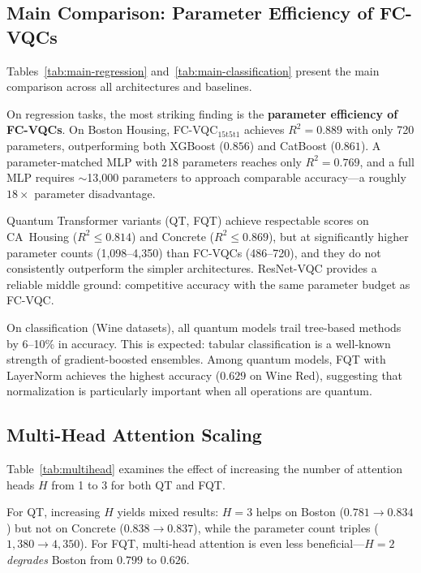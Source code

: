 


\subsection{Main Comparison: Parameter Efficiency of FC-VQCs}
\label{sec:results-main}

Tables~\ref{tab:main-regression} and~\ref{tab:main-classification} present
the main comparison across all architectures and baselines.

On regression tasks, the most striking finding is the \textbf{parameter
efficiency of FC-VQCs}.  On Boston Housing, FC-VQC$_{15\mathrm{t}5\mathrm{t}1}$
achieves $R^2{=}0.889$ with only 720 parameters, outperforming both XGBoost
($0.856$) and CatBoost ($0.861$).  A parameter-matched MLP with 218
parameters reaches only $R^2{=}0.769$, and a full MLP requires
${\sim}$13{,}000 parameters to approach comparable accuracy---a roughly
$18{\times}$ parameter disadvantage.

Quantum Transformer variants (QT, FQT) achieve respectable scores on
CA~Housing ($R^2{\leq}0.814$) and Concrete ($R^2{\leq}0.869$), but at
significantly higher parameter counts (1{,}098--4{,}350) than FC-VQCs
(486--720), and they do not consistently outperform the simpler architectures.
ResNet-VQC provides a reliable middle ground: competitive accuracy with the
same parameter budget as FC-VQC.

On classification (Wine datasets), all quantum models trail tree-based
methods by 6--10\% in accuracy.  This is expected: tabular classification is
a well-known strength of gradient-boosted ensembles.  Among quantum models,
FQT with LayerNorm achieves the highest accuracy ($0.629$ on Wine Red),
suggesting that normalization is particularly important when all operations
are quantum.

\subsection{Multi-Head Attention Scaling}
\label{sec:results-multihead}

Table~\ref{tab:multihead} examines the effect of increasing the number of
attention heads $H$ from 1 to 3 for both QT and FQT.

For QT, increasing $H$ yields mixed results: $H{=}3$ helps on Boston
($0.781 \to 0.834$) but not on Concrete ($0.838 \to 0.837$), while the
parameter count triples ($1{,}380 \to 4{,}350$).  For FQT, multi-head
attention is even less beneficial---$H{=}2$ \emph{degrades} Boston from
$0.799$ to $0.626$.

